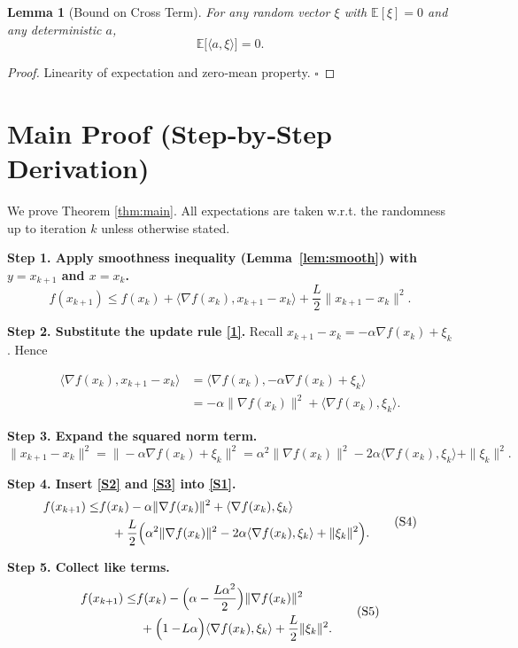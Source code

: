 \documentclass{article}
\newtheorem{lemma}{Lemma}
\newcommand{\E}{\mathbb{E}}
\begin{document}
\begin{lemma}[Bound on Cross Term]\label{lem:cross}
For any random vector $\xi$ with $\E[\xi]=0$ and any deterministic $a$,
\[
\E\bigl[\langle a,\xi\rangle\bigr]=0.
\tag{L2}
\]
\end{lemma}
\begin{proof}
Linearity of expectation and zero‑mean property. $\square$
\end{proof}

\section*{Main Proof (Step‑by‑Step Derivation)}
We prove Theorem \ref{thm:main}.  All expectations are taken w.r.t.
the randomness up to iteration $k$ unless otherwise stated.

\noindent\textbf{Step 1. Apply smoothness inequality (Lemma~\ref{lem:smooth}) with
$y=x_{k+1}$ and $x=x_{k}$.}
\[
f(x_{k+1})\le f(x_{k})+\langle\nabla f(x_{k}),x_{k+1}-x_{k}\rangle
+\frac{L}{2}\|x_{k+1}-x_{k}\|^{2}.
\tag{S1}
\]

\noindent\textbf{Step 2. Substitute the update rule \eqref{1}.}
Recall $x_{k+1}-x_{k}= -\alpha\nabla f(x_{k})+\xi_{k}$. Hence  

\[
\begin{aligned}
\langle\nabla f(x_{k}),x_{k+1}-x_{k}\rangle
&= \langle\nabla f(x_{k}),-\alpha\nabla f(x_{k})+\xi_{k}\rangle \\
&= -\alpha\|\nabla f(x_{k})\|^{2}
   +\langle\nabla f(x_{k}),\xi_{k}\rangle .
\end{aligned}
\tag{S2}
\]

\noindent\textbf{Step 3. Expand the squared norm term.}
\[
\|x_{k+1}-x_{k}\|^{2}
= \|-\alpha\nabla f(x_{k})+\xi_{k}\|^{2}
= \alpha^{2}\|\nabla f(x_{k})\|^{2}
  -2\alpha\langle\nabla f(x_{k}),\xi_{k}\rangle
  +\|\xi_{k}\|^{2}.
\tag{S3}
\]

\noindent\textbf{Step 4. Insert \eqref{S2} and \eqref{S3} into \eqref{S1}.}
\[
\begin{aligned}
f(x_{k+1}) \le &
f(x_{k})
-\alpha\|\nabla f(x_{k})\|^{2}
+\langle\nabla f(x_{k}),\xi_{k}\rangle \\
&\quad+\frac{L}{2}\Bigl(\alpha^{2}\|\nabla f(x_{k})\|^{2}
-2\alpha\langle\nabla f(x_{k}),\xi_{k}\rangle
+\|\xi_{k}\|^{2}\Bigr).
\end{aligned}
\tag{S4}
\]

\noindent\textbf{Step 5. Collect like terms.}
\[
\begin{aligned}
f(x_{k+1}) \le &
f(x_{k})
-\Bigl(\alpha-\frac{L\alpha^{2}}{2}\Bigr)\|\nabla f(x_{k})\|^{2} \\
&\;+\Bigl(1-\!L\alpha\Bigr)\langle\nabla f(x_{k}),\xi_{k}\rangle
+\frac{L}{2}\|\xi_{k}\|^{2}.
\end{aligned}
\tag{S5}
\]
\end{document}
